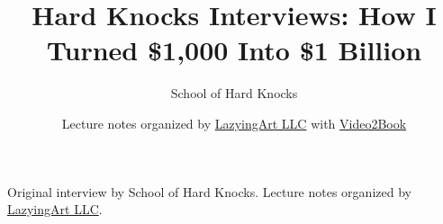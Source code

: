\documentclass[11pt,oneside]{book}
\begin{document}
\frontmatter
\title{Hard Knocks Interviews: How I Turned \$1,000 Into \$1 Billion}
\author{School of Hard Knocks}
\date{Lecture notes organized by \href{https://lazying.art}{LazyingArt LLC} with \href{https://github.com/lachlanchen/Video2Book}{Video2Book}}
\maketitle
\begin{center}
\small Original interview by School of Hard Knocks. Lecture notes organized by \href{https://lazying.art}{LazyingArt LLC}.
\end{center}
\clearpage
\mainmatter

\end{document}
